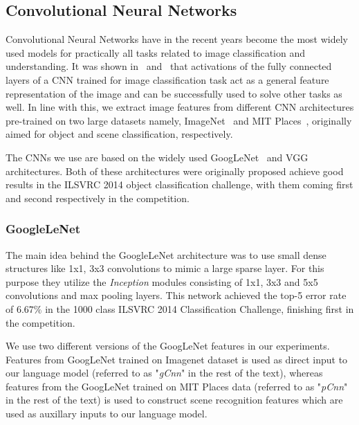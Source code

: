 \subsection{Convolutional Neural Networks}
Convolutional Neural Networks have in the recent years become the most widely
used models for practically all tasks related to image classification and
understanding.
It was shown in~\cite{Donahue2014} and~\cite{Razavian2014CVPR} that activations
of the fully connected layers of a CNN trained for image classification task act
as a general feature representation of the image and can be successfully used to
solve other tasks as well.
In line with this, we extract image features from different CNN architectures
pre-trained on two large datasets namely, ImageNet~\cite{ImagenetOrig} and MIT
Places~\cite{Zhou2014NIPS}, originally aimed for object and scene
classification, respectively.

The CNNs we use are based on the widely used
GoogLeNet~\cite{DBLP:journals/corr/SzegedyLJSRAEVR14} and VGG~\cite{Simonyan14c}
architectures. 
Both of these architectures were originally proposed achieve good results in the
ILSVRC 2014 object classification challenge, with them coming first and second
respectively in the competition.

\subsubsection{GoogleLeNet} 
\label{subsec:gCNN}
The main idea behind the GoogleLeNet architecture was to use small dense
structures like 1x1, 3x3 convolutions to mimic a large sparse layer.
For this purpose they utilize the \emph{Inception} modules consisting of 1x1,
3x3 and 5x5 convolutions and max pooling layers.
This network achieved the top-5 error rate of $6.67\%$ in the 1000 class ILSVRC 2014
Classification Challenge, finishing first in the competition.

We use two different versions of the GoogLeNet features in our experiments.
Features from GoogLeNet trained on Imagenet dataset is used as direct input to
our language model (referred to as "\emph{gCnn}" in the rest of the text),
whereas features from the GoogLeNet trained on MIT Places data (referred to as
"\emph{pCnn}" in the rest of the text) is used to construct scene recognition
features which are used as auxillary inputs to our language model.

